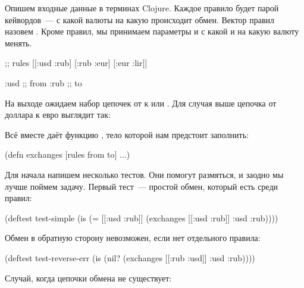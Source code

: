 Опишем входные данные в терминах Clojure. Каждое правило будет парой кейвордов~---
с какой валюты на какую происходит обмен. Вектор правил назовем . Кроме
правил, мы принимаем параметры  и  с какой и на какую валюту менять.

\begin{english}
  \begin{clojure}
;; rules
[[:usd :rub] [:rub :eur] [:eur :lir]]

:usd ;; from
:rub ;; to
  \end{clojure}
\end{english}

На выходе ожидаем набор цепочек от  к  или . Для случая выше
цепочка от доллара к евро выглядит так:

\begin{english}
  \begin{clojure}
  \end{clojure}
\end{english}

Всё вместе даёт функцию , тело которой нам предстоит заполнить:

\begin{english}
  \begin{clojure}
(defn exchanges [rules from to]
  ...)
  \end{clojure}
\end{english}

Для начала напишем несколько тестов. Они помогут размяться, и заодно мы лучше
поймем задачу. Первый тест~--- простой обмен, который есть среди правил:

\begin{english}
  \begin{clojure}
(deftest test-simple
  (is (= [[:usd :rub]]
         (exchanges [[:usd :rub]] :usd :rub))))
  \end{clojure}
\end{english}

Обмен в обратную сторону невозможен, если нет отдельного правила:

\begin{english}
  \begin{clojure}
(deftest test-reverse-err
  (is (nil? (exchanges [[:rub :usd]] :usd :rub))))
  \end{clojure}
\end{english}

Случай, когда цепочки обмена не существует:

